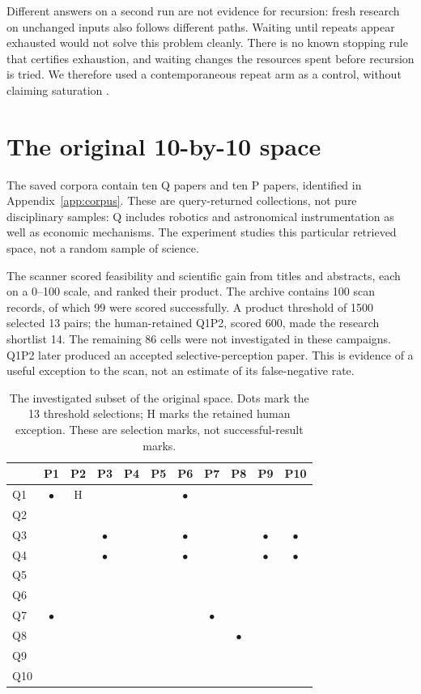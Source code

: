 \documentclass[11pt,a4paper]{article}
\newcommand{\sel}{\(\bullet\)}
\begin{document}
Different answers on a second run are not evidence for recursion: fresh
research on unchanged inputs also follows different paths. Waiting until
repeats appear exhausted would not solve this problem cleanly. There is no
known stopping rule that certifies exhaustion, and waiting changes the
resources spent before recursion is tried. We therefore used a contemporaneous
repeat arm as a control, without claiming saturation \cite{protocol}.

\section{The original 10-by-10 space}

The saved corpora contain ten Q papers and ten P papers, identified in
Appendix~\ref{app:corpus}. These are query-returned collections, not pure
disciplinary samples: Q includes robotics and astronomical instrumentation
as well as economic mechanisms. The experiment studies this particular
retrieved space, not a random sample of science.

The scanner scored feasibility and scientific gain from titles and abstracts,
each on a 0--100 scale, and ranked their product. The archive contains 100 scan
records, of which 99 were scored successfully. A product threshold of 1500
selected 13 pairs; the human-retained Q1P2, scored 600, made the research
shortlist 14. The remaining 86 cells were not investigated in these campaigns.
Q1P2 later produced an accepted selective-perception paper. This is evidence
of a useful exception to the scan, not an estimate of its false-negative rate.

\begin{table}[ht]
\centering\small
\begin{tabular}{l*{10}{c}}
\toprule
 & P1&P2&P3&P4&P5&P6&P7&P8&P9&P10\\
\midrule
Q1&\sel&H&&&&\sel&&&&\\
Q2&&&&&&&&&&\\
Q3&&&\sel&&&\sel&&&\sel&\sel\\
Q4&&&\sel&&&\sel&&&\sel&\sel\\
Q5&&&&&&&&&&\\
Q6&&&&&&&&&&\\
Q7&\sel&&&&&&\sel&&&\\
Q8&&&&&&&&\sel&&\\
Q9&&&&&&&&&&\\
Q10&&&&&&&&&&\\
\bottomrule
\end{tabular}
\caption{The investigated subset of the original space. Dots mark the
13 threshold selections; H marks the retained human exception. These are
selection marks, not successful-result marks.}
\end{table}
\end{document}
